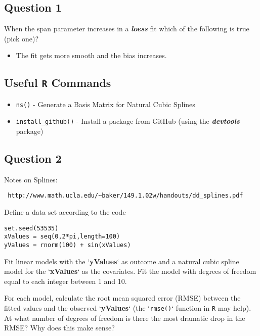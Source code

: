 \documentclass[12pt]{article}
\begin{document}
\subsection*{Question 1}

When the span parameter increases in a \textit{\textbf{loess}} fit which of the following is true
(pick one)?

\begin{itemize}
\item The fit gets more smooth and the bias increases.
\end{itemize}


\subsection*{Useful \texttt{R} Commands}
\begin{itemize}
\item \texttt{ns()} - Generate a Basis Matrix for Natural Cubic Splines
\item \texttt{install\_github()} - Install a package from GitHub (using the \textit{\textbf{devtools}} package)
\end{itemize}
\newpage
\subsection*{Question 2}
Notes on Splines:
\begin{verbatim} http://www.math.ucla.edu/~baker/149.1.02w/handouts/dd_splines.pdf
\end{verbatim}
Define a data set according to the code

\begin{framed}
\begin{verbatim}
set.seed(53535)
xValues = seq(0,2*pi,length=100)
yValues = rnorm(100) + sin(xValues)
\end{verbatim}
\end{framed}

Fit linear models with the `\textbf{yValues}` as outcome and a natural cubic spline model
for the `\textbf{xValues}` as the covariates. Fit the model with degrees of freedom equal
to each integer between 1 and 10. 


\noindent For each model, calculate the root mean
squared error (RMSE) between the fitted values and the observed `\textbf{yValues}` (the
`\texttt{rmse()}` function in \texttt{R} may help). At what number of degrees of freedom is there
the most dramatic drop in the RMSE? Why does this make sense?
\end{document}

